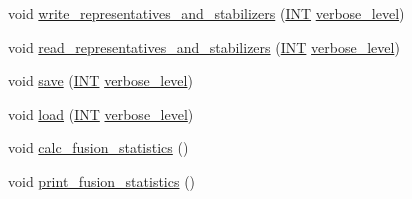 \begin{DoxyCompactItemize}
void \mbox{\hyperlink{classrepresentatives_a63e383a197b4f354b1226db6b67414df}{write\+\_\+representatives\+\_\+and\+\_\+stabilizers}} (\mbox{\hyperlink{galois_8h_a09fddde158a3a20bd2dcadb609de11dc}{I\+NT}} \mbox{\hyperlink{simeon_8_c_a818073fbcc2f439e7c56952f67386122}{verbose\+\_\+level}})
\item 
void \mbox{\hyperlink{classrepresentatives_a265f9011bf89e9be28e9627ad127f0f4}{read\+\_\+representatives\+\_\+and\+\_\+stabilizers}} (\mbox{\hyperlink{galois_8h_a09fddde158a3a20bd2dcadb609de11dc}{I\+NT}} \mbox{\hyperlink{simeon_8_c_a818073fbcc2f439e7c56952f67386122}{verbose\+\_\+level}})
\item 
void \mbox{\hyperlink{classrepresentatives_a55b82caf4dcd8c5f717ceb448104c95b}{save}} (\mbox{\hyperlink{galois_8h_a09fddde158a3a20bd2dcadb609de11dc}{I\+NT}} \mbox{\hyperlink{simeon_8_c_a818073fbcc2f439e7c56952f67386122}{verbose\+\_\+level}})
\item 
void \mbox{\hyperlink{classrepresentatives_af9a82206de511896846f35ea46d29515}{load}} (\mbox{\hyperlink{galois_8h_a09fddde158a3a20bd2dcadb609de11dc}{I\+NT}} \mbox{\hyperlink{simeon_8_c_a818073fbcc2f439e7c56952f67386122}{verbose\+\_\+level}})
\item 
void \mbox{\hyperlink{classrepresentatives_ac776d4e7be572086b4daed9addafe785}{calc\+\_\+fusion\+\_\+statistics}} ()
\item 
void \mbox{\hyperlink{classrepresentatives_a9bdb780751cf68579922dba75250b2c5}{print\+\_\+fusion\+\_\+statistics}} ()
\end{DoxyCompactItemize}
